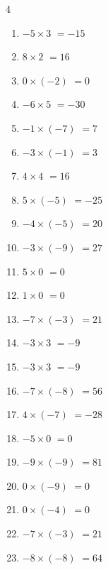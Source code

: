 \begin{multicols}{4}
\begin{enumerate}
  \item $-5\times 3$
        $=-15$

  \item $8\times 2$
        $=16$

  \item $0\times (-2)$
        $=0$

  \item $-6\times 5$
        $=-30$

  \item $-1\times (-7)$
        $=7$

  \item $-3\times (-1)$
        $=3$

  \item $4\times 4$
        $=16$

  \item $5\times (-5)$
        $=-25$

  \item $-4\times (-5)$
        $=20$

  \item $-3\times (-9)$
        $=27$

  \item $5\times 0$
        $=0$

  \item $1\times 0$
        $=0$

  \item $-7\times (-3)$
        $=21$

  \item $-3\times 3$
        $=-9$

  \item $-3\times 3$
        $=-9$

  \item $-7\times (-8)$
        $=56$

  \item $4\times (-7)$
        $=-28$

  \item $-5\times 0$
        $=0$

  \item $-9\times (-9)$
        $=81$

  \item $0\times (-9)$
        $=0$

  \item $0\times (-4)$
        $=0$

  \item $-7\times (-3)$
        $=21$

  \item $-8\times (-8)$
        $=64$


\end{enumerate}
\end{multicols}
